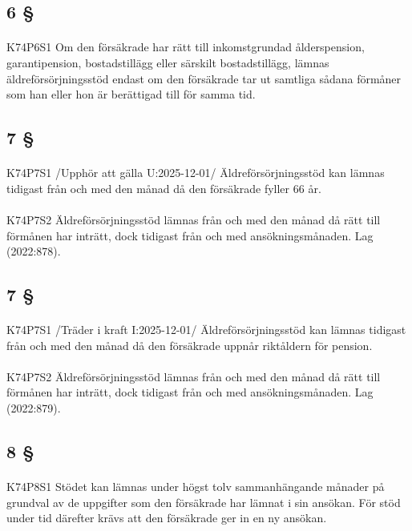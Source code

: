 \documentclass[a4paper,notitlepage,openany,10pt]{book}
\begin{document}
\subsection*{6 §}
\paragraph*{}
{\tiny K74P6S1}
Om den försäkrade har rätt till inkomstgrundad ålderspension, garantipension, bostadstillägg eller särskilt bostadstillägg, lämnas äldreförsörjningsstöd endast om den försäkrade tar ut samtliga sådana förmåner som han eller hon är berättigad till för samma tid.
\subsection*{7 §}
\paragraph*{}
{\tiny K74P7S1}
/Upphör att gälla U:2025-12-01/
Äldreförsörjningsstöd kan lämnas tidigast från och med den månad då den försäkrade fyller 66 år.
\paragraph*{}
{\tiny K74P7S2}
Äldreförsörjningsstöd lämnas från och med den månad då rätt till förmånen har inträtt, dock tidigast från och med ansökningsmånaden.
Lag (2022:878).
\subsection*{7 §}
\paragraph*{}
{\tiny K74P7S1}
/Träder i kraft I:2025-12-01/
Äldreförsörjningsstöd kan lämnas tidigast från och med den månad då den försäkrade uppnår riktåldern för pension.
\paragraph*{}
{\tiny K74P7S2}
Äldreförsörjningsstöd lämnas från och med den månad då rätt till förmånen har inträtt, dock tidigast från och med ansökningsmånaden.
Lag (2022:879).
\subsection*{8 §}
\paragraph*{}
{\tiny K74P8S1}
Stödet kan lämnas under högst tolv sammanhängande månader på grundval av de uppgifter som den försäkrade har lämnat i sin ansökan. För stöd under tid därefter krävs att den försäkrade ger in en ny ansökan.
\end{document}
